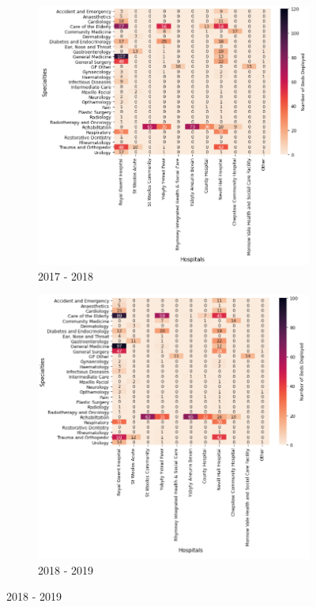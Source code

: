 \documentclass[../thesis.tex]{subfiles}
\begin{document}
\begin{figure}
     \centering
     \begin{subfigure}[h!]{0.8\textwidth}
         \centering
         \includegraphics[width=\textwidth]{Chapters/Chapter5/Figures/2017DET.png}
         \caption{2017 - 2018}
         \label{fig:detexppy2a}
     \end{subfigure}
\hfill
     \begin{subfigure}{0.8\textwidth}
         \centering
         \includegraphics[width=\textwidth]{Chapters/Chapter5/Figures/2018DET.png}
         \caption{2018 - 2019}
         \label{fig:detexppy2b}
     \end{subfigure}
     \end{figure}
\end{document}
